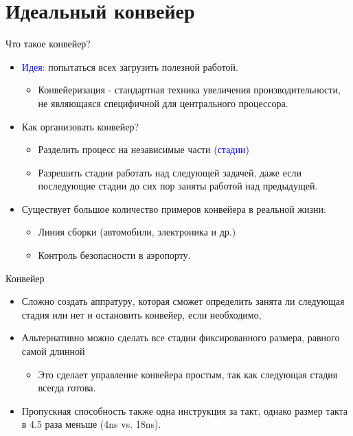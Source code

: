 \section{Идеальный конвейер}

\begin{frame}{Что такое конвейер?}
\begin{itemize}
    \item \textcolor{blue}{Идея:} попытаться всех загрузить полезной работой.
    \begin{itemize}
        \item Конвейеризация - стандартная техника увеличения производительности, не являющаяся специфичной для центрального процессора.\pause
    \end{itemize}
    \item Как организовать конвейер?\pause
    \begin{itemize}
        \item Разделить процесс на независимые части (\textcolor{blue}{стадии})\pause
        \item Разрешить стадии работать над следующей задачей, даже если последующие стадии до сих пор заняты работой над предыдущей.\pause
    \end{itemize}
    \item Существует большое количество примеров конвейера в реальной жизни:\pause
    \begin{itemize}
        \item Линия сборки (автомобили, электроника и др.)
        \item Контроль безопасности в аэропорту.
    \end{itemize}
\end{itemize}
\end{frame}

\begin{frame}{Конвейер}
\begin{itemize}
    \item Сложно создать аппратуру, которая сможет определить занята ли следующая стадия или нет и остановить конвейер, если необходимо,
    \item Альтернативно можно сделать все стадии фиксированного размера, равного самой длинной
    \begin{itemize}
        \item Это сделает управление конвейера простым, так как следующая стадия всегда готова.
    \end{itemize}
\end{itemize}
\centering
{}
\begin{itemize}
    \item Пропускная способность также одна инструкция за такт, однако размер такта в 4.5 раза меньше (4ns vs. 18ns).
\end{itemize}
\end{frame}

